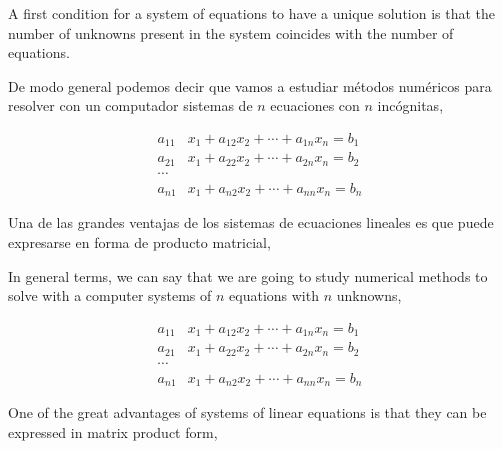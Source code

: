 \begin{paracol}{2}
A first condition for a system of equations to have a unique solution is that the number of unknowns present in the system coincides with the number of equations. 

\switchcolumn

De modo general podemos decir que vamos a estudiar métodos numéricos para resolver con un computador sistemas de $n$ ecuaciones con $n$ incógnitas,

\begin{align*}
a_{11}&x_1+a_{12}x_2+\cdots +a_{1n}x_n=b_1\\
a_{21}&x_1+a_{22}x_2+\cdots +a_{2n}x_n=b_2\\
\cdots & \\
a_{n1}&x_1+a_{n2}x_2+\cdots +a_{nn}x_n=b_n
\end{align*}  

Una de las grandes ventajas de los sistemas de ecuaciones lineales es que puede expresarse en forma de producto matricial,

\switchcolumn

In general terms, we can say that we are going to study numerical methods to solve with a computer systems of $n$ equations with $n$ unknowns,

\begin{align*}
a_{11}&x_1+a_{12}x_2+\cdots +a_{1n}x_n=b_1\\
a_{21}&x_1+a_{22}x_2+\cdots +a_{2n}x_n=b_2\\
\cdots & \\
a_{n1}&x_1+a_{n2}x_2+\cdots +a_{nn}x_n=b_n
\end{align*}  

One of the great advantages of systems of linear equations is that they can be expressed in matrix product form,

\end{paracol}



